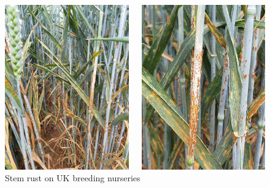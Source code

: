 \documentclass[10pt,dvipsnames,ignorenonframetext,aspectratio=169]{beamer}
\begin{document}
\begin{frame}{}
\protect\hypertarget{section-6}{}
\begin{figure}\caption{Stem rust on UK breeding nurseries}\begin{columns}

\begin{center}\includegraphics[width=0.55\linewidth]{../images/FWGDjevXwAEBzeT} \end{center}


\begin{center}\includegraphics[width=0.55\linewidth]{../images/FWGDkkkWYAA3yF4} \end{center}


\end{columns}
\end{figure}
\end{frame}
\end{document}
